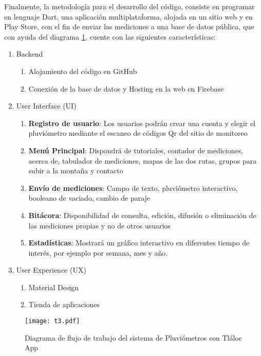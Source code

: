Finalmente, la metodología para el desarrollo del código, consiste en programar en lenguaje Dart, una aplicación multiplataforma, alojada en un sitio web y en Play Store, con el fin de enviar las mediciones a una base de datos pública, que con ayuda del diagrama \ref{t3}, cuente con las siguientes características:

\begin{enumerate}
  \item Backend \begin{enumerate}
    \item Alojamiento del código en GitHub
    \item Conexión de la base de datos y Hosting en la web en Firebase
  \end{enumerate}
  \item User Interface (UI) \begin{enumerate}
    \item \textbf{Registro de usuario}: Los usuarios podrán crear una cuenta y elegir el pluviómetro mediante el escaneo de códigos Qr del sitio de monitoreo 
    \item \textbf{Menú Principal}: Dispondrá de tutoriales, contador de mediciones, acerca de, tabulador de mediciones, mapas de las dos rutas, grupos para subir a la montaña y contacto
    \item \textbf{Envío de mediciones}: Campo de texto, pluviómetro interactivo, booleano de vaciado, cambio de paraje
    \item \textbf{Bitácora}: Disponibilidad de consulta, edición, difusión o eliminación de las mediciones propias y no de otros usuarios
    \item \textbf{Estadísticas}: Mostrará un gráfico interactivo en diferentes tiempo de interés, por ejemplo por semana, mes y año.
\end{enumerate}
  \item User Experience (UX) \begin{enumerate}
    \item Material Design
    \item Tienda de aplicaciones
  \end{enumerate}
\end{enumerate}

\begin{figure}[ht]
\centering
  \texttt{[image: t3.pdf]}
  \caption{Diagrama de flujo de trabajo del sistema de Pluviómetros con Tláloc App}
  \label{t3}
\end{figure}
















